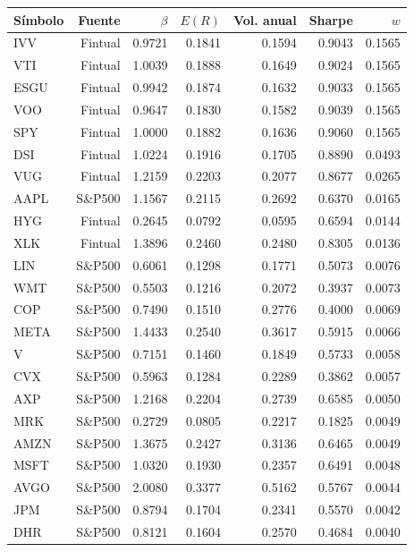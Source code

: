 \begin{table}[htbp]
\centering
\begin{tabular}{lrrrrrr}
\hline
Símbolo & Fuente & $\beta$ & $E(R)$ & Vol. anual & Sharpe & $w$ \\
\hline
IVV & Fintual & 0.9721 & 0.1841 & 0.1594 & 0.9043 & 0.1565 \\
VTI & Fintual & 1.0039 & 0.1888 & 0.1649 & 0.9024 & 0.1565 \\
ESGU & Fintual & 0.9942 & 0.1874 & 0.1632 & 0.9033 & 0.1565 \\
VOO & Fintual & 0.9647 & 0.1830 & 0.1582 & 0.9039 & 0.1565 \\
SPY & Fintual & 1.0000 & 0.1882 & 0.1636 & 0.9060 & 0.1565 \\
DSI & Fintual & 1.0224 & 0.1916 & 0.1705 & 0.8890 & 0.0493 \\
VUG & Fintual & 1.2159 & 0.2203 & 0.2077 & 0.8677 & 0.0265 \\
AAPL & S\&P500 & 1.1567 & 0.2115 & 0.2692 & 0.6370 & 0.0165 \\
HYG & Fintual & 0.2645 & 0.0792 & 0.0595 & 0.6594 & 0.0144 \\
XLK & Fintual & 1.3896 & 0.2460 & 0.2480 & 0.8305 & 0.0136 \\
LIN & S\&P500 & 0.6061 & 0.1298 & 0.1771 & 0.5073 & 0.0076 \\
WMT & S\&P500 & 0.5503 & 0.1216 & 0.2072 & 0.3937 & 0.0073 \\
COP & S\&P500 & 0.7490 & 0.1510 & 0.2776 & 0.4000 & 0.0069 \\
META & S\&P500 & 1.4433 & 0.2540 & 0.3617 & 0.5915 & 0.0066 \\
V & S\&P500 & 0.7151 & 0.1460 & 0.1849 & 0.5733 & 0.0058 \\
CVX & S\&P500 & 0.5963 & 0.1284 & 0.2289 & 0.3862 & 0.0057 \\
AXP & S\&P500 & 1.2168 & 0.2204 & 0.2739 & 0.6585 & 0.0050 \\
MRK & S\&P500 & 0.2729 & 0.0805 & 0.2217 & 0.1825 & 0.0049 \\
AMZN & S\&P500 & 1.3675 & 0.2427 & 0.3136 & 0.6465 & 0.0049 \\
MSFT & S\&P500 & 1.0320 & 0.1930 & 0.2357 & 0.6491 & 0.0048 \\
AVGO & S\&P500 & 2.0080 & 0.3377 & 0.5162 & 0.5767 & 0.0044 \\
JPM & S\&P500 & 0.8794 & 0.1704 & 0.2341 & 0.5570 & 0.0042 \\
DHR & S\&P500 & 0.8121 & 0.1604 & 0.2570 & 0.4684 & 0.0040 \\

\end{tabular}
\end{table}
